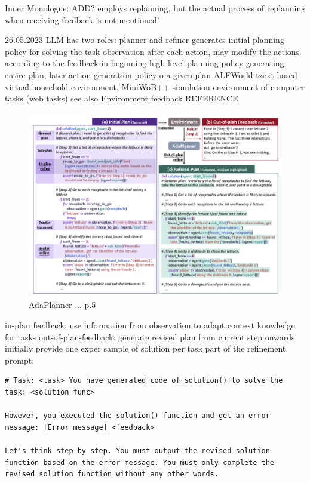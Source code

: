 \documentclass{article}
\begin{document}
Inner Monologue: ADD? employs replanning, but the actual process of replanning when receiving feedback is not mentioned! \cite{huang_inner_2022}

\cite{sun_adaplanner_2023-1} 26.05.2023 LLM has two roles: planner and refiner
generates initial planning policy for solving the task
observation after each action, may modify the actions according to the feedback 
in beginning high level planning policy generating entire plan, later action-generation policy o a given plan
ALFWorld tzext based virtual household environment, MiniWoB++ simulation environment of computer tasks (web tasks)
see  also Environment feedback REFERENCE
\begin{figure}[h]
	\centering
	\includegraphics[width=1.0\linewidth]{AdaPlannerRefinementFlow.png}
	\caption{AdaPlanner ...\cite{sun_adaplanner_2023-1} p.5}
	\label{fig:llmagentoverview}
\end{figure}
in-plan feedback: use information from observation to adapt context knowledge for tasks
out-of-plan-feedback: generate revised plan from current step onwards
initially provide one exper sample of solution per task
part of the refinement prompt:
\begin{verbatim}
# Task: <task> You have generated code of solution() to solve the task: <solution_func> 

However, you executed the solution() function and get an error message: [Error message] <feedback> 

Let's think step by step. You must output the revised solution function based on the error message. You must only complete the revised solution function without any other words.
\end{verbatim}
\end{document}
